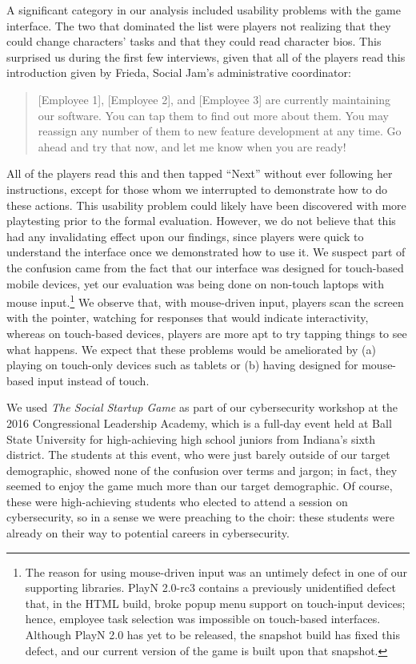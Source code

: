 \documentclass[letterpaper]{article}
\begin{document}
A significant category in our analysis included usability problems
with the game interface.
The two that dominated the list were players not realizing that they
could change characters' tasks and that they could
read character bios. This surprised us during the first few interviews,
given that all of the players read this introduction given by Frieda,
Social Jam's administrative coordinator:
\begin{quote} 
  [Employee 1], [Employee 2], and [Employee 3] are currently maintaining our
  software. You can tap them to find out more about them. You may
  reassign any number of them to new feature development at any
  time. Go ahead and try that now, and let me know when you are ready!
\end{quote}
All of the players read this and then tapped ``Next'' without ever following her
instructions, except for those whom we interrupted to demonstrate
how to do these actions.
%
This usability problem could likely have been discovered with more
playtesting prior to the formal evaluation. However, we do not believe
that this had any invalidating effect upon our findings, since players
were quick to understand the interface once we demonstrated how to use
it. We suspect part of the confusion came from the fact that our
interface was designed for touch-based mobile devices, yet our
evaluation was being done on non-touch laptops with mouse
input.\footnote{The reason for using mouse-driven input was an
  untimely defect in one of our supporting libraries.  PlayN 2.0-rc3
  contains a previously unidentified defect that, in the HTML build,
  broke popup menu support on touch-input devices; hence, employee task
  selection was impossible on touch-based interfaces. Although PlayN
  2.0 has yet to be released, the snapshot build has fixed this
  defect, and our current version of the game is built upon that
  snapshot.}  We observe that, with mouse-driven input, players scan the
screen with the pointer, watching for responses that would indicate
interactivity, whereas on touch-based devices, players are more apt to
try tapping things to see what happens. We expect that these problems
would be ameliorated by (a) playing
on touch-only devices such as tablets or (b) having designed for mouse-based
input instead of touch.

We used \textit{The Social Startup Game} as part of our 
cybersecurity workshop 
at the 2016 Congressional Leadership Academy, which is a full-day event
held at Ball State University
for high-achieving high school juniors from Indiana's sixth district.
The students at this event, who were just barely outside of our
target demographic, showed none of the confusion over terms
and jargon; in fact, they seemed to enjoy the game much more than our
target demographic. 
Of course, these were high-achieving students who elected
to attend a session on cybersecurity, so in a sense we were preaching
to the choir: these students were already on their way to potential
careers in cybersecurity. 
\end{document}

